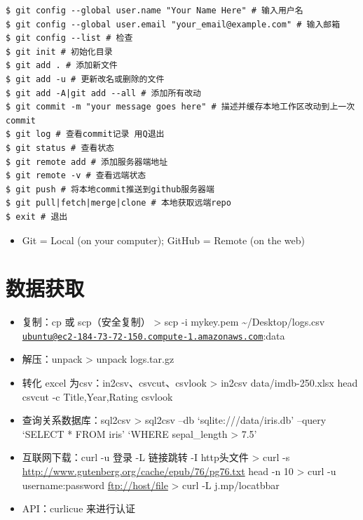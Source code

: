 \documentclass[
]{book}
\providecommand{\tightlist}{%
  \setlength{\itemsep}{0pt}\setlength{\parskip}{0pt}}
\begin{document}
\begin{verbatim}
$ git config --global user.name "Your Name Here" # 输入用户名
$ git config --global user.email "your_email@example.com" # 输入邮箱
$ git config --list # 检查
$ git init # 初始化目录
$ git add . # 添加新文件
$ git add -u # 更新改名或删除的文件
$ git add -A|git add --all # 添加所有改动
$ git commit -m "your message goes here" # 描述并缓存本地工作区改动到上一次commit
$ git log # 查看commit记录 用Q退出
$ git status # 查看状态
$ git remote add # 添加服务器端地址
$ git remote -v # 查看远端状态
$ git push # 将本地commit推送到github服务器端
$ git pull|fetch|merge|clone # 本地获取远端repo
$ exit # 退出
\end{verbatim}

\begin{itemize}
\tightlist
\item
  Git = Local (on your computer); GitHub = Remote (on the web)
\end{itemize}

\hypertarget{ux6570ux636eux83b7ux53d6}{%
\section{数据获取}\label{ux6570ux636eux83b7ux53d6}}

\begin{itemize}
\item
  复制：cp 或 scp（安全复制）
  \textgreater{} scp -i mykey.pem \textasciitilde/Desktop/logs.csv \href{mailto:ubuntu@ec2-184-73-72-150.compute-1.amazonaws.com}{\nolinkurl{ubuntu@ec2-184-73-72-150.compute-1.amazonaws.com}}:data
\item
  解压：unpack
  \textgreater{} unpack logs.tar.gz
\item
  转化 excel 为csv：in2csv、csvcut、csvlook
  \textgreater{} in2csv data/imdb-250.xlsx \textbar{} head \textbar{} csvcut -c Title,Year,Rating \textbar{} csvlook
\item
  查询关系数据库：sql2csv
  \textgreater{} sql2csv --db `sqlite:///data/iris.db' --query `SELECT * FROM iris' `WHERE sepal\_length \textgreater{} 7.5'
\item
  互联网下载：curl -u 登录 -L 链接跳转 -I http头文件
  \textgreater{} curl -s \url{http://www.gutenberg.org/cache/epub/76/pg76.txt} \textbar{} head -n 10
  \textgreater{} curl -u username:password \url{ftp://host/file}
  \textgreater{} curl -L j.mp/locatbbar
\item
  API：curlicue 来进行认证
\end{itemize}
\end{document}

